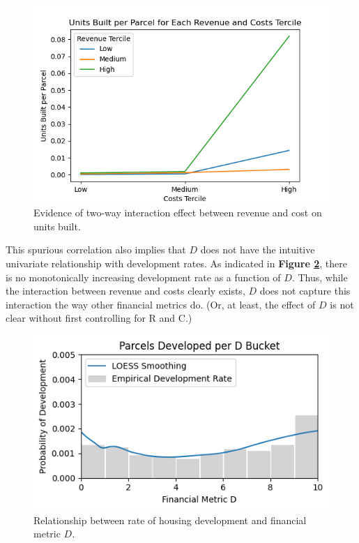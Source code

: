 \documentclass[a4paper,12pt]{article}
\begin{document}
\begin{figure}[hbt]
    \centering
    \includegraphics[scale=.75]{iv/revenue_vs_cost_interact.png}
    \caption{Evidence of two-way interaction effect between revenue and cost on units built.}
    \label{fig:revenue_vs_cost_interact}
\end{figure}



This spurious correlation also implies that $D$ does not have the intuitive univariate relationship with development rates. As indicated in \textbf{Figure \ref{fig:d_vs_proportion_developed}}, there is no monotonically increasing development rate as a function of $D$. Thus, while the interaction between revenue and costs clearly exists, $D$ does not capture this interaction the way other financial metrics do. (Or, at least, the effect of $D$ is not clear without first controlling for R and C.)

\begin{figure}[hbt]
    \centering
    \includegraphics[scale=.75]{figures/development_vs_D.png}
    \caption{Relationship between rate of housing development and financial metric $D$.}
    \label{fig:d_vs_proportion_developed}
\end{figure}
\end{document}
